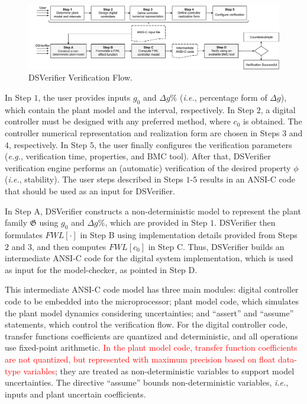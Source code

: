 \documentclass{sig-alternate-05-2015}
\begin{document}
\begin{figure}[t]
\centering
\includegraphics[width=\textwidth]{figures/verification-flow.pdf}
\caption{DSVerifier Verification Flow.}
\label{DSVerifier_process}
\end{figure}

In Step $1$, the user provides inputs $g_0$ and $\Delta{g}\%$ ({\it i.e.}, percentage form of $\Delta{g}$), which contain the plant model and the interval, respectively. In Step $2$, a digital controller must be designed with any preferred method, where $c_0$ is obtained. The controller numerical representation and realization form are chosen in Steps $3$ and $4$, respectively. In Step $5$, the user finally configures the verification parameters ({\it e.g.}, verification time, properties, and BMC tool). After that, DSVerifier verification engine performs an (automatic) verification of the desired property $\phi$ ({\it i.e.}, stability). The user steps described in Steps $1$-$5$ results in an ANSI-C code that should be used as an input for DSVerifier.

In Step A, DSVerifier constructs a non-deterministic model to represent the plant family $\mathfrak{G}$ using $g_0$ and $\Delta{g}\%$, which are provided in Step $1$. DSVerifier then formulates $FWL[\cdot]$ in Step B using implementation details provided from Steps $2$ and $3$, and then computes $FWL[c_0]$ in Step C. Thus, DSVerifier builds an intermediate ANSI-C code for the digital system implementation, which is used as input for the model-checker, as pointed in Step D.

This intermediate ANSI-C code model has three main modules: digital controller code to be embedded into the microprocessor; plant model code, which simulates the plant model dynamics considering uncertainties; and ``assert'' and ``assume'' statements, which control the verification flow. For the digital controller code, transfer functions coefficients are quantized and deterministic, and all operations use fixed-point arithmetic. \textcolor{red}{In the plant model code, transfer function coefficients are not quantized, but represented with maximum precision based on float data-type variables}; they are treated as non-deterministic variables to support model uncertainties. The directive ``assume'' bounds non-deterministic variables, {\it i.e.}, inputs and plant uncertain coefficients.
\end{document}
